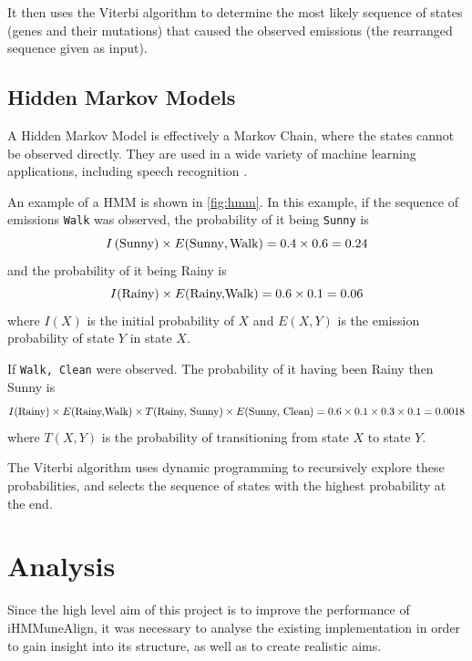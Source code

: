 It then uses the Viterbi algorithm to determine the most likely sequence of states (genes and their mutations) that caused the observed emissions (the rearranged sequence given as input).

\section{Hidden Markov Models}
\label{sec:viterbi}

A Hidden Markov Model is effectively a Markov Chain, where the states cannot be observed directly. They are used in a wide variety of machine learning applications, including speech recognition \autocite{hmm}.

An example of a HMM is shown in \autoref{fig:hmm}. In this example, if the sequence of emissions \texttt{Walk} was observed, the probability of it being \texttt{Sunny} is
$$I\left(\textnormal{Sunny}\right) \times E(\textnormal{Sunny},\textnormal{Walk}) = 0.4 \times 0.6 = 0.24$$
and the probability of it being Rainy is
$$I(\textnormal{Rainy}) \times E(\textnormal{Rainy,Walk}) =
0.6 \times 0.1 = 0.06$$
where $I(X)$ is the initial probability of $X$ and $E(X,Y)$ is the emission probability of state $Y$ in state $X$.

If \texttt{Walk, Clean} were observed. The probability of it having been Rainy then Sunny is
$$
  I(\textnormal{Rainy})
  \times
  E(\textnormal{Rainy,Walk})
  \times
  T(\textnormal{Rainy, Sunny})
  \times
  E(\textnormal{Sunny, Clean})
  =
  0.6 \times 0.1 \times 0.3 \times 0.1
  = 0.0018
$$
where $T(X, Y)$ is the probability of transitioning from state $X$ to state $Y$.

The Viterbi algorithm uses dynamic programming to recursively explore these probabilities, and selects the sequence of states with the highest probability at the end.

\chapter{Analysis}
Since the high level aim of this project is to improve the performance of iHMMuneAlign, it was necessary to analyse the existing implementation in order to gain insight into its structure, as well as to create realistic aims.

